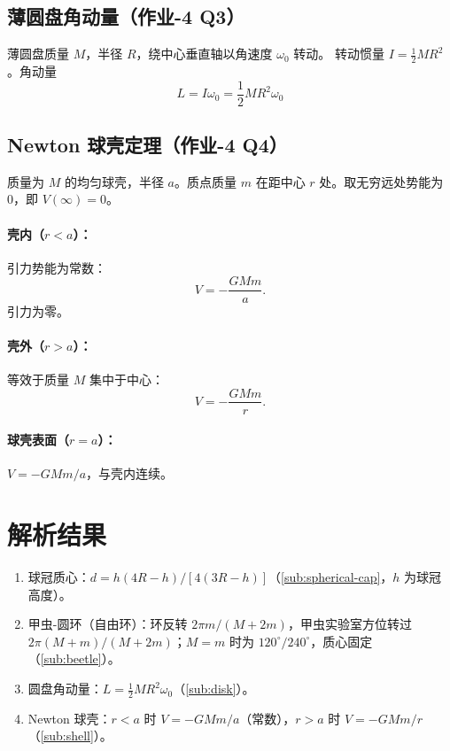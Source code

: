 \documentclass[UTF8,a4paper,11pt]{ctexart}
\begin{document}
\subsection{薄圆盘角动量（作业-4 Q3）}
\label{sub:disk}

薄圆盘质量 $M$，半径 $R$，绕中心垂直轴以角速度 $\omega_0$ 转动。
转动惯量 $I=\frac12 MR^2$。角动量
\begin{equation}
  \boxed{\;L=I\omega_0=\frac12 MR^2\omega_0\;}
\end{equation}

\subsection{Newton 球壳定理（作业-4 Q4）}
\label{sub:shell}

质量为 $M$ 的均匀球壳，半径 $a$。质点质量 $m$ 在距中心 $r$ 处。取无穷远处势能为 0，即 $V(\infty)=0$。

\paragraph{壳内（$r<a$）：} 引力势能为常数：
\begin{equation}
  V=-\frac{GMm}{a}.
\end{equation}
引力为零。

\paragraph{壳外（$r>a$）：} 等效于质量 $M$ 集中于中心：
\begin{equation}
  V=-\frac{GMm}{r}.
\end{equation}

\paragraph{球壳表面（$r=a$）：} $V=-GMm/a$，与壳内连续。

\section{解析结果}
\label{sec:result}

\begin{enumerate}
  \item 球冠质心：$d=h(4R-h)/[4(3R-h)]$（\eqref{sub:spherical-cap}，$h$ 为球冠高度）。
  \item 甲虫-圆环（自由环）：环反转 $2\pi m/(M+2m)$，甲虫实验室方位转过 $2\pi(M+m)/(M+2m)$；$M=m$ 时为 $120^\circ/240^\circ$，质心固定（\eqref{sub:beetle}）。
  \item 圆盘角动量：$L=\frac12 MR^2\omega_0$（\eqref{sub:disk}）。
  \item Newton 球壳：$r<a$ 时 $V=-GMm/a$（常数），$r>a$ 时 $V=-GMm/r$
        （\eqref{sub:shell}）。
\end{enumerate}
\end{document}

